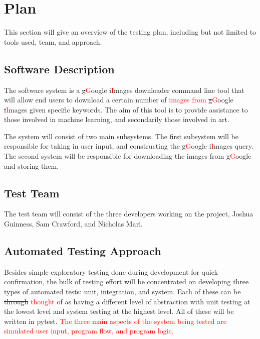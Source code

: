 \documentclass[12pt, titlepage]{article}
\begin{document}
\section{Plan} 

This section will give an overview of the testing plan, including but not limited to tools used, team, and approach.
	
\subsection{Software Description}

The software system is a \sout{g}\textcolor{red}{G}oogle \sout{i}\textcolor{red}{I}mages downloader command line tool that will allow end users to download a certain number of \textcolor{red}{images from} \sout{g}\textcolor{red}{G}oogle \sout{i}\textcolor{red}{I}mages given specific keywords. The aim of this tool is to provide assistance to those involved in machine learning, and secondarily those involved in art.

The system will consist of two main subsystems. The first subsystem will be responsible for taking in user input, and constructing the \sout{g}\textcolor{red}{G}oogle \sout{i}\textcolor{red}{I}mages query. The second system will be responsible for downloading the images from \sout{g}\textcolor{red}{G}oogle and storing them. 

\subsection{Test Team}

The test team will consist of the three developers working on the project, Joshua Guinness, Sam Crawford, and Nicholas Mari.

\subsection{Automated Testing Approach}

Besides simple exploratory testing done during development for quick confirmation, the bulk of testing effort will be 
concentrated on developing three types of automated tests: unit, integration, and system. Each of these can be \sout{through} 
\textcolor{red}{thought} of as having a different level of abstraction with unit testing at the lowest level and system testing at the highest 
level. All of these will be written in pytest. \textcolor{red}{The three main aspects of the system being tested are 
simulated user input, program flow, and program logic.}
\end{document}
